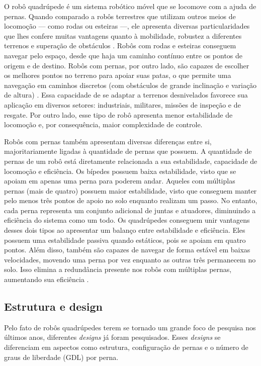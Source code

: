 \documentclass[../main.tex]{subfiles}
\begin{document}
O robô quadrúpede é um sistema robótico móvel que se locomove com a ajuda de pernas. Quando comparado a robôs terrestres que utilizam outros meios de locomoção --- como rodas ou esteiras ---, ele apresenta diversas particularidades que lhes confere muitas vantagens quanto à mobilidade, robustez a diferentes terrenos e superação de obstáculos \cite{Biswal2021}. Robôs com rodas e esteiras conseguem navegar pelo espaço, desde que haja um caminho contínuo entre os pontos de origem e de destino. Robôs com pernas, por outro lado, são capazes de escolher os melhores pontos no terreno para apoiar suas patas, o que permite uma navegação em caminhos discretos (com obstáculos de grande inclinação e variação de altura) \cite{Yao2021}. Essa capacidade de se adaptar a terrenos desnivelados favorece sua aplicação em diversos setores: industriais, militares, missões de inspeção e de resgate. Por outro lado, esse tipo de robô apresenta menor estabilidade de locomoção e, por consequência, maior complexidade de controle.

Robôs com pernas também apresentam diversas diferenças entre si, majoritariamente ligadas à quantidade de pernas que possuem. A quantidade de pernas de um robô está diretamente relacionada a sua estabilidade, capacidade de locomoção e eficiência. Os bípedes possuem baixa estabilidade, visto que se apoiam em apenas uma perna para poderem andar. Aqueles com múltiplas pernas (mais de quatro) possuem maior estabilidade, visto que conseguem manter pelo menos três pontos de apoio no solo enquanto realizam um passo. No entanto, cada perna representa um conjunto adicional de juntas e atuadores, diminuindo a eficiência do sistema como um todo. Os quadrúpedes conseguem unir vantagens desses dois tipos ao apresentar um balanço entre estabilidade e eficiência. Eles possuem uma estabilidade passiva quando estáticos, pois se apoiam em quatro pontos. Além disso, também são capazes de navegar de forma estável em baixas velocidades, movendo uma perna por vez enquanto as outras três permanecem no solo. Isso elimina a redundância presente nos robôs com múltiplas pernas, aumentando sua eficiência \cite{Yao2021}.

\subsection{Estrutura e design}
Pelo fato de robôs quadrúpedes terem se tornado um grande foco de pesquisa nos últimos anos, diferentes \textit{designs} já foram pesquisados. Esses \textit{designs} se diferenciam em aspectos como estrutura, configuração de pernas e o número de graus de liberdade (GDL) por perna.
\end{document}
